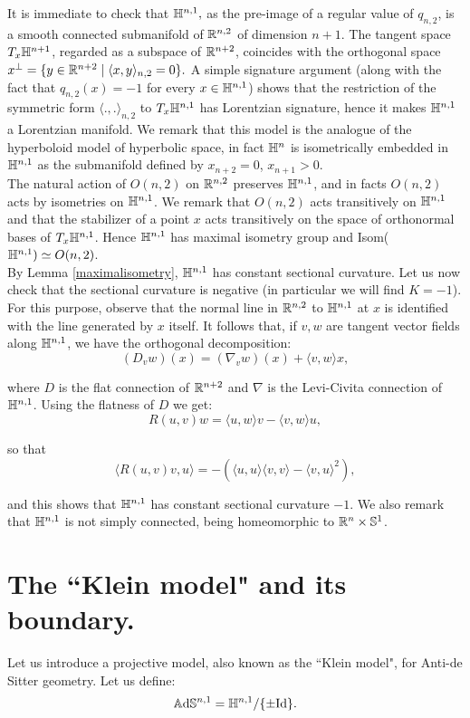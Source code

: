 It is immediate to check that $\mathbb{H}^{n,1},$ as the pre-image of a regular value of $q_{n,2}$, is a smooth connected submanifold of $\mathbb{R}^{n,2}$ of dimension $n+1$. The tangent space $T_x\mathbb{H}^{n+1}$, regarded as a subspace of $\mathbb{R}^{n+2}$, coincides with the orthogonal space $x^{\perp}=\{y\in \mathbb{R}^{n+2}\;|\;\langle x,y\rangle_{n,2}=0\}.$ A simple signature argument (along with the fact that $q_{n,2}(x)=-1$ for every $x\in\mathbb{H}^{n,1}$) shows that the restriction of the symmetric form $\langle .,. \rangle_{n,2}$ to $T_x\mathbb{H}^{n,1}$ has Lorentzian signature, hence it makes $\mathbb{H}^{n,1}$ a Lorentzian manifold. We remark that this model is the analogue of the hyperboloid model of hyperbolic space, in fact $\mathbb{H}^n$ is isometrically embedded in $\mathbb{H}^{n,1}$ as the submanifold defined by $x_{n+2}=0$, $x_{n+1}>0$. \\
The natural action of $O(n,2)$ on $\mathbb{R}^{n,2}$ preserves $\mathbb{H}^{n,1}$, and in facts $O(n,2)$ acts by isometries on $\mathbb{H}^{n,1}$. We remark that $O(n,2)$ acts transitively on $\mathbb{H}^{n,1}$ and that the stabilizer of a point $x$ acts transitively on the space of orthonormal bases of $T_x\mathbb{H}^{n,1}$. Hence $\mathbb{H}^{n,1}$ has maximal isometry group and Isom($\mathbb{H}^{n,1})\simeq O(n,2)$.\\
By Lemma \ref{maximalisometry}, $\mathbb{H}^{n,1}$ has constant sectional curvature. Let us now check that the sectional curvature is negative (in particular we will find $K=-1$). For this purpose, observe that the normal line in $\mathbb{R}^{n,2}$ to $\mathbb{H}^{n,1}$ at $x$ is identified with the line generated by $x$ itself. It follows that, if $v,w$ are tangent vector fields along $\mathbb{H}^{n,1}$, we have the orthogonal decomposition: 
\[
    (D_{v}w)(x)=(\nabla_{v}w)(x)+\langle v,w\rangle x, 
\]

where $D$ is the flat connection of $\mathbb{R}^{n+2}$ and $\nabla$ is the Levi-Civita connection of $\mathbb{H}^{n,1}$. Using the flatness of $D$ we get: 
\[
    R(u,v)w=\langle u,w\rangle v-\langle v,w\rangle u,
\]

so that 
\[
    \langle R(u,v)v,u \rangle =-(\langle u,u\rangle\langle v,v\rangle-\langle v,u\rangle^2), 
\]

and this shows that $\mathbb{H}^{n,1}$ has constant sectional curvature $-1$. We also remark that $\mathbb{H}^{n,1}$ is not simply connected, being homeomorphic to $\mathbb{R}^{n}\times \mathbb{S}^1$. 

\section{The ``Klein model" and its boundary.}
Let us introduce a projective model, also known as the ``Klein model", for Anti-de Sitter geometry. Let us define: 
\[
    \mathbb{A}\mathrm{d}\mathbb{S}^{n,1}=\mathbb{H}^{n,1}/\{\pm \text{Id}\}.
\]


